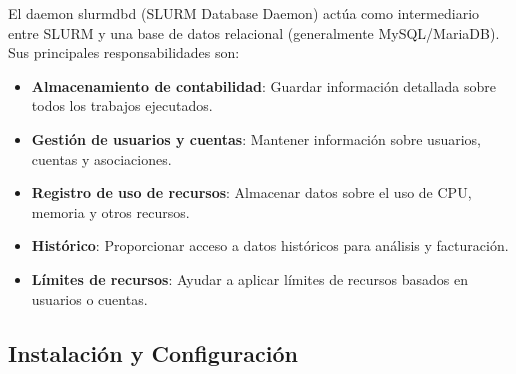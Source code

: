 \documentclass[12pt,a4paper]{article}
\begin{document}
El daemon slurmdbd (SLURM Database Daemon) actúa como intermediario entre SLURM y una base de datos relacional (generalmente MySQL/MariaDB). Sus principales responsabilidades son:

\begin{itemize}[leftmargin=*]    \item \textbf{Almacenamiento de contabilidad}: Guardar información detallada sobre todos los trabajos ejecutados.
    \item \textbf{Gestión de usuarios y cuentas}: Mantener información sobre usuarios, cuentas y asociaciones.
    \item \textbf{Registro de uso de recursos}: Almacenar datos sobre el uso de CPU, memoria y otros recursos.
    \item \textbf{Histórico}: Proporcionar acceso a datos históricos para análisis y facturación.
    \item \textbf{Límites de recursos}: Ayudar a aplicar límites de recursos basados en usuarios o cuentas.
\end{itemize}

\subsection{Instalación y Configuración}
\end{document}
